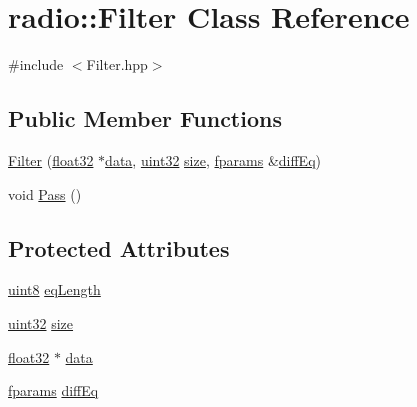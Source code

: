 \hypertarget{classradio_1_1Filter}{\section{radio\+:\+:Filter Class Reference}
\label{classradio_1_1Filter}
}


{\ttfamily \#include $<$Filter.\+hpp$>$}

\subsection*{Public Member Functions}
\begin{DoxyCompactItemize}
\item 
\hyperlink{classradio_1_1Filter_a48ab268192e0135e5c9f74ad35a90fa1}{Filter} (\hyperlink{definitions_8hpp_aacdc525d6f7bddb3ae95d5c311bd06a1}{float32} $\ast$\hyperlink{classradio_1_1Filter_a25459a2b762120df0102f00553344be2}{data}, \hyperlink{definitions_8hpp_a1134b580f8da4de94ca6b1de4d37975e}{uint32} \hyperlink{classradio_1_1Filter_a7285b4c7263d8278e38abb14b5dca5d9}{size}, \hyperlink{definitions_8hpp_a7615684c2af56be5f302c5b367d71f6b}{fparams} \&\hyperlink{classradio_1_1Filter_abe705768a267844edfa2aaabfdac9f56}{diff\+Eq})
\item 
void \hyperlink{classradio_1_1Filter_ad2793821801780809af385463bf8f197}{Pass} ()
\end{DoxyCompactItemize}
\subsection*{Protected Attributes}
\begin{DoxyCompactItemize}
\item 
\hyperlink{definitions_8hpp_adde6aaee8457bee49c2a92621fe22b79}{uint8} \hyperlink{classradio_1_1Filter_a26a32320c4dffa8925ab5f0f06689e8d}{eq\+Length}
\item 
\hyperlink{definitions_8hpp_a1134b580f8da4de94ca6b1de4d37975e}{uint32} \hyperlink{classradio_1_1Filter_a7285b4c7263d8278e38abb14b5dca5d9}{size}
\item 
\hyperlink{definitions_8hpp_aacdc525d6f7bddb3ae95d5c311bd06a1}{float32} $\ast$ \hyperlink{classradio_1_1Filter_a25459a2b762120df0102f00553344be2}{data}
\item 
\hyperlink{definitions_8hpp_a7615684c2af56be5f302c5b367d71f6b}{fparams} \hyperlink{classradio_1_1Filter_abe705768a267844edfa2aaabfdac9f56}{diff\+Eq}
\end{DoxyCompactItemize}


